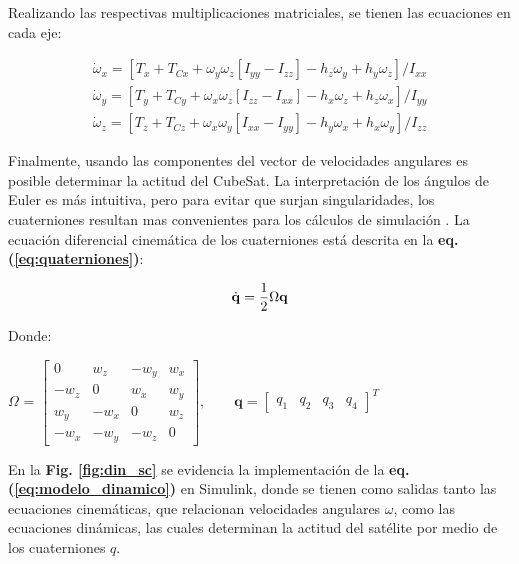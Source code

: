 \noindent Realizando las respectivas multiplicaciones matriciales, se tienen las ecuaciones en cada eje:

\begin{gather}	
	\dot{\omega}_x=\left[T_x+T_{C x}+\omega_y \omega_z\left[I_{y y}-I_{z z}\right]-h_z \omega_y+h_y \omega_z\right] / I_{x x}\label{eq:modelo_dinamico_x}\\
	\dot{\omega}_y=\left[T_y+T_{C y}+\omega_x \omega_z\left[I_{z z}-I_{x x}\right]-h_x \omega_z+h_z \omega_x\right] / I_{y y}\label{eq:modelo_dinamico_y}\\
	\dot{\omega}_z=\left[T_z+T_{C z}+\omega_x \omega_y\left[I_{x x}-I_{y y}\right]-h_y \omega_x+h_x \omega_y\right] / I_{z z}
\end{gather}


Finalmente, usando las componentes del vector de velocidades angulares es posible determinar la actitud del CubeSat. La interpretación de los ángulos de Euler es más intuitiva, pero para evitar que surjan singularidades, los cuaterniones resultan mas convenientes para los cálculos de simulación \cite{Steyn2011}. La ecuación diferencial cinemática de los cuaterniones está descrita en la  \textbf{eq.(\ref{eq:quaterniones})}: 

\begin{equation}\label{eq:quaterniones}
	\dot{\mathbf{q}}=\frac{1}{2} \Omega \mathbf{q} \\
\end{equation}

Donde:
 

\begin{center}
	$\Omega$ = $\left[\begin{array}{cccc}
		0 & w_z & -w_y & w_x \\
		-w_z & 0 & w_x & w_y \\
		w_y & -w_x & 0 & w_z \\
		-w_x & -w_y & -w_z & 0
	\end{array}\right],
	\qquad
	\mathbf{q}=\left[\begin{array}{llll}
		q_1 & q_2 & q_3 & q_4
	\end{array}\right]^T
	$
\end{center}

En la \textbf{Fig. \ref{fig:din_sc}} se evidencia la implementación de la \textbf{eq.(\ref{eq:modelo_dinamico})} en Simulink, donde se tienen como salidas tanto las ecuaciones cinemáticas, que relacionan velocidades angulares $\omega$, como las ecuaciones dinámicas, las cuales determinan la actitud del satélite por medio de los cuaterniones $q$.


